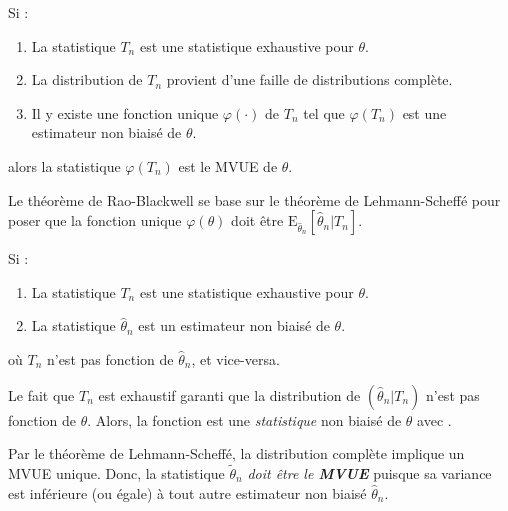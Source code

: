 \documentclass[french]{article}
\begin{document}
\begin{multicols*}{2}
	
\begin{definitionNOHFILLsub}
Si : 
\begin{enumerate}[label = \circled{\arabic*}{trueblue}]
	\item	La statistique $T_{n}$ est une statistique exhaustive pour $\theta$.
	\item	La distribution de $T_{n}$ provient d'une faille de distributions complète.
	\item	Il y existe une fonction unique $\varphi(\cdot)$ de $T_{n}$ tel que $\varphi(T_{n})$ est une estimateur non biaisé de $\theta$.
\end{enumerate}
alors la statistique $\varphi(T_{n})$ est le MVUE de $\theta$.
\end{definitionNOHFILLsub}


\begin{rappel_enhanced}[Contexte]
Le théorème de Rao-Blackwell se base sur le théorème de Lehmann-Scheffé pour poser que la fonction unique $\varphi(\theta)$ doit être $\text{E}_{\hat{\theta}_{n}}[\hat{\theta}_{n} | T_{n}]$.
\end{rappel_enhanced}

\begin{definitionNOHFILLsub}
Si : 
\begin{enumerate}
	\item	La statistique $T_{n}$ est une statistique exhaustive pour $\theta$.
	\item	La statistique $\hat{\theta}_{n}$ est un estimateur non biaisé de $\theta$.
\end{enumerate}
où $T_{n}$ n'est pas fonction de $\hat{\theta}_{n}$, et vice-versa.

\bigskip

Le fait que $T_{n}$ est exhaustif garanti que la distribution de $(\hat{\theta}_{n} | T_{n})$ n'est pas fonction de $\theta$. Alors, la fonction  est une \textit{statistique} non biaisé de $\theta$ avec .

\bigskip

Par le théorème de Lehmann-Scheffé, la distribution complète implique un MVUE unique. Donc, la statistique $\tilde{\theta}_{n}$ \textit{doit être le \textbf{MVUE}} puisque sa variance est inférieure (ou égale) à tout autre estimateur non biaisé $\hat{\theta}_{n}$.
\end{definitionNOHFILLsub}



\end{multicols*}
\end{document}
